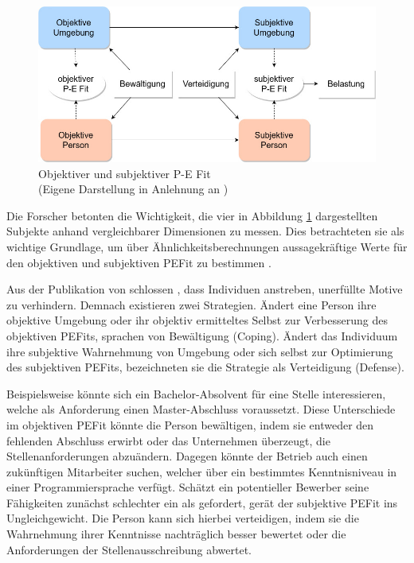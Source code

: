 \begin{figure}[h]
	\centering
	\includegraphics[width=1\textwidth]{gfx/subjektivObjektivPEFit.jpg}
	\caption{Objektiver und subjektiver P-E Fit\\
		(Eigene Darstellung in Anlehnung an \cite[S. 22]{edwards:2008})}
	\label{fig:personEnvironmentFit:subjektivObjektiv:abb1}
\end{figure}

Die Forscher betonten die Wichtigkeit, die vier in Abbildung \ref{fig:personEnvironmentFit:subjektivObjektiv:abb1} dargestellten Subjekte anhand vergleichbarer Dimensionen zu messen. Dies betrachteten sie als wichtige Grundlage, um über Ähnlichkeitsberechnungen aussagekräftige Werte für den objektiven und subjektiven \ac{PEFit} zu bestimmen \cite[S. 2f.]{copingAndAdaption:1974}.

Aus der Publikation von \textcite[S. 10ff.]{french:1962} schlossen \textcite[S. 15]{copingAndAdaption:1974}, dass Individuen anstreben, unerfüllte Motive zu verhindern. Demnach existieren zwei Strategien. Ändert eine Person ihre objektive Umgebung oder ihr objektiv ermitteltes Selbst zur Verbesserung des objektiven \acp{PEFit}, sprachen \textcite[S. 15f.]{copingAndAdaption:1974} von Bewältigung (Coping). Ändert das Individuum ihre subjektive Wahrnehmung von Umgebung oder sich selbst zur Optimierung des subjektiven \acp{PEFit}, bezeichneten sie die Strategie als Verteidigung (Defense).

Beispielsweise könnte sich ein Bachelor-Absolvent für eine Stelle interessieren, welche als Anforderung einen Master-Abschluss voraussetzt. Diese Unterschiede im objektiven \ac{PEFit} könnte die Person bewältigen, indem sie entweder den fehlenden Abschluss erwirbt oder das Unternehmen überzeugt, die Stellenanforderungen abzuändern. Dagegen könnte der Betrieb auch einen zukünftigen Mitarbeiter suchen, welcher über ein bestimmtes Kenntnisniveau in einer Programmiersprache verfügt. Schätzt ein potentieller Bewerber seine Fähigkeiten zunächst schlechter ein als gefordert, gerät der subjektive \ac{PEFit} ins Ungleichgewicht. Die Person kann sich hierbei verteidigen, indem sie die Wahrnehmung ihrer Kenntnisse nachträglich besser bewertet oder die Anforderungen der Stellenausschreibung abwertet.

